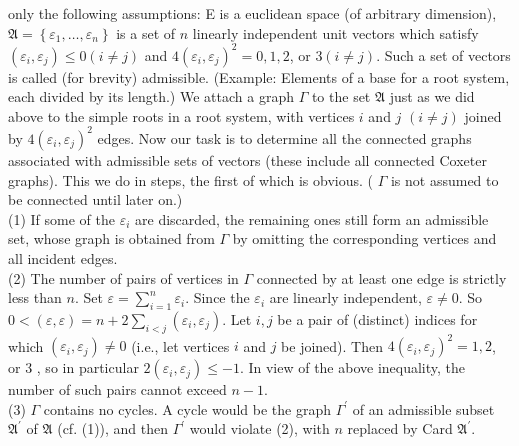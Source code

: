 \documentclass[10pt]{article}
\begin{document}
only the following assumptions: E is a euclidean space (of arbitrary dimension), $\mathfrak{A}=\left\{\varepsilon_{1}, \ldots, \varepsilon_{n}\right\}$ is a set of $n$ linearly independent unit vectors which satisfy $\left(\varepsilon_{i}, \varepsilon_{j}\right) \leq 0(i \neq j)$ and $4\left(\varepsilon_{i}, \varepsilon_{j}\right)^{2}=0,1,2$, or $3(i \neq j)$. Such a set of vectors is called (for brevity) admissible. (Example: Elements of a base for a root system, each divided by its length.) We attach a graph $\Gamma$ to the set $\mathfrak{A}$ just as we did above to the simple roots in a root system, with vertices $i$ and $j$ $(i \neq j)$ joined by $4\left(\varepsilon_{i}, \varepsilon_{j}\right)^{2}$ edges. Now our task is to determine all the connected graphs associated with admissible sets of vectors (these include all connected Coxeter graphs). This we do in steps, the first of which is obvious. ( $\Gamma$ is not assumed to be connected until later on.)\\
(1) If some of the $\varepsilon_{i}$ are discarded, the remaining ones still form an admissible set, whose graph is obtained from $\Gamma$ by omitting the corresponding vertices and all incident edges.\\
(2) The number of pairs of vertices in $\Gamma$ connected by at least one edge is strictly less than $n$. Set $\varepsilon=\sum_{i=1}^{n} \varepsilon_{i}$. Since the $\varepsilon_{i}$ are linearly independent, $\varepsilon \neq 0$. So $0<(\varepsilon, \varepsilon)=n+2 \sum_{i<j}\left(\varepsilon_{i}, \varepsilon_{j}\right)$. Let $i, j$ be a pair of (distinct) indices for which $\left(\varepsilon_{i}, \varepsilon_{j}\right) \neq 0$ (i.e., let vertices $i$ and $j$ be joined). Then $4\left(\varepsilon_{i}, \varepsilon_{j}\right)^{2}=1,2$, or 3 , so in particular $2\left(\varepsilon_{i}, \varepsilon_{j}\right) \leq-1$. In view of the above inequality, the number of such pairs cannot exceed $n-1$.\\
(3) $\Gamma$ contains no cycles. A cycle would be the graph $\Gamma^{\prime}$ of an admissible subset $\mathfrak{A}^{\prime}$ of $\mathfrak{A}$ (cf. (1)), and then $\Gamma^{\prime}$ would violate (2), with $n$ replaced by Card $\mathfrak{A}^{\prime}$.\\
\end{document}
